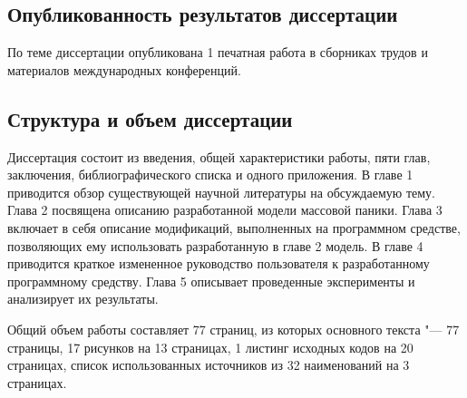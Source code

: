 \subsection*{\textbf{Опубликованность результатов диссертации}}

По теме диссертации опубликована 1 печатная работа в сборниках трудов и материалов международных конференций.

\subsection*{\textbf{Структура и объем диссертации}}

Диссертация состоит из введения, общей характеристики работы, пяти глав, заключения, библиографического списка и одного приложения.
В главе 1 приводится обзор существующей научной литературы на обсуждаемую тему. Глава 2 посвящена описанию разработанной модели массовой паники.
Глава 3 включает в себя описание модификаций, выполненных на программном средстве, позволяющих ему использовать разработанную в главе 2 модель.
В главе 4 приводится краткое измененное руководство пользователя к разработанному программному средству.
Глава 5 описывает проведенные эксперименты и анализирует их результаты.

Общий объем работы составляет 77 страниц, из которых основного текста "--- 77 страницы, 17 рисунков на 13 страницах, 1 листинг исходных кодов на 20 страницах,
список использованных источников из 32 наименований на 3 страницах.

